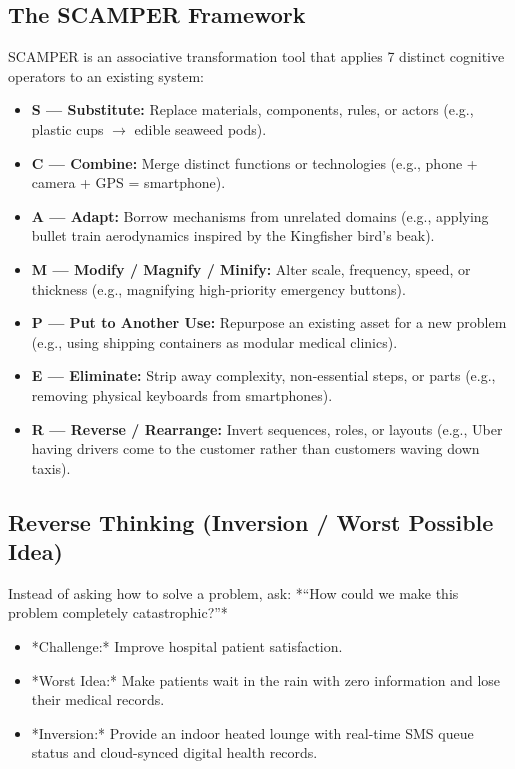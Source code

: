 \subsection{The SCAMPER Framework}
SCAMPER is an associative transformation tool that applies 7 distinct cognitive operators to an existing system:
\begin{itemize}[leftmargin=1.2em, itemsep=3pt]
    \item \textbf{S --- Substitute:} Replace materials, components, rules, or actors (e.g., plastic cups $\rightarrow$ edible seaweed pods).
    \item \textbf{C --- Combine:} Merge distinct functions or technologies (e.g., phone + camera + GPS = smartphone).
    \item \textbf{A --- Adapt:} Borrow mechanisms from unrelated domains (e.g., applying bullet train aerodynamics inspired by the Kingfisher bird's beak).
    \item \textbf{M --- Modify / Magnify / Minify:} Alter scale, frequency, speed, or thickness (e.g., magnifying high-priority emergency buttons).
    \item \textbf{P --- Put to Another Use:} Repurpose an existing asset for a new problem (e.g., using shipping containers as modular medical clinics).
    \item \textbf{E --- Eliminate:} Strip away complexity, non-essential steps, or parts (e.g., removing physical keyboards from smartphones).
    \item \textbf{R --- Reverse / Rearrange:} Invert sequences, roles, or layouts (e.g., Uber having drivers come to the customer rather than customers waving down taxis).
\end{itemize}

\subsection{Reverse Thinking (Inversion / Worst Possible Idea)}
Instead of asking how to solve a problem, ask: *``How could we make this problem completely catastrophic?''*
\begin{itemize}[leftmargin=1.2em, itemsep=2pt]
    \item *Challenge:* Improve hospital patient satisfaction.
    \item *Worst Idea:* Make patients wait in the rain with zero information and lose their medical records.
    \item *Inversion:* Provide an indoor heated lounge with real-time SMS queue status and cloud-synced digital health records.
\end{itemize}

